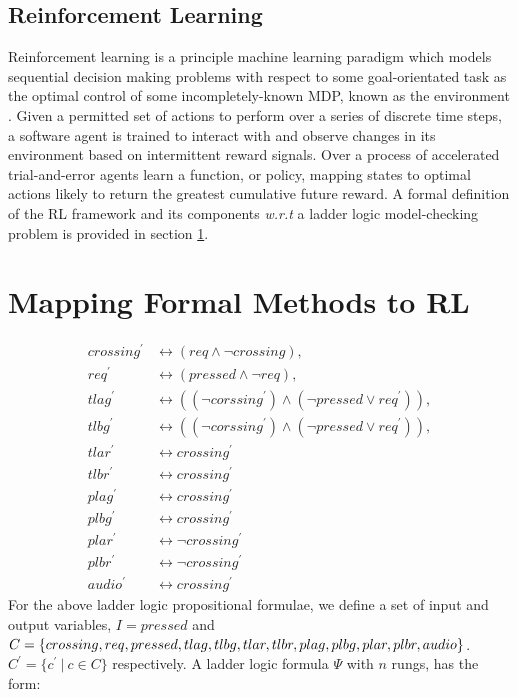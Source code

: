 \documentclass[runningheads]{llncs}
\begin{document}
\subsection{Reinforcement Learning}

Reinforcement learning is a principle machine learning paradigm which models sequential decision making problems with respect to some goal-orientated task as the optimal control of some incompletely-known MDP, known as the environment  \cite{sutton2018reinforcement}. Given a permitted set of actions to perform over a series of discrete time steps, a software agent is trained to interact with and observe changes in its environment based on intermittent reward signals. Over a process of accelerated trial-and-error agents learn a function, or policy, mapping states to optimal actions likely to return the greatest cumulative future reward. A formal definition of the RL framework and its components \textit{w.r.t} a ladder logic model-checking problem is provided in section \ref{sec:mapping_fm_to_ml}. 


\section{Mapping Formal Methods to RL} \label{sec:mapping_fm_to_ml}

\begin{align}
	crossing^\prime & \leftrightarrow (req \land \lnot crossing), \\
	req^\prime & \leftrightarrow (pressed \land \lnot req), \\
	tlag^\prime & \leftrightarrow ((\lnot corssing^\prime) \land (\lnot pressed \lor req^\prime)), \\
	tlbg ^\prime & \leftrightarrow ((\lnot corssing^\prime) \land (\lnot pressed \lor req^\prime)), \\
	tlar^\prime & \leftrightarrow crossing^\prime \\
	tlbr^\prime & \leftrightarrow crossing^\prime \\
	plag^\prime & \leftrightarrow crossing^\prime \\
	plbg^\prime & \leftrightarrow crossing^\prime \\
	plar^\prime & \leftrightarrow \lnot crossing^\prime \\
	plbr^\prime & \leftrightarrow \lnot crossing^\prime \\ 
	audio^\prime & \leftrightarrow crossing^\prime
\end{align}
For the above ladder logic propositional formulae, we define a set of input and output variables, $I = {pressed}$ and
$C = \{crossing, req, pressed, tlag, tlbg, tlar, \\ tlbr, plag, plbg, plar, plbr, audio\}$. $C^\prime = \{c^\prime \ | \ c \in C \}$ respectively. A ladder logic formula $\Psi$ with $n$ rungs, has the form:
\end{document}
